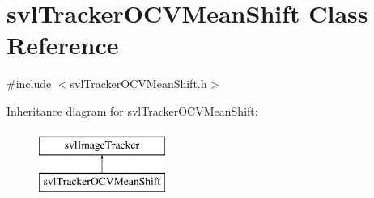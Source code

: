 \hypertarget{classsvl_tracker_o_c_v_mean_shift}{}\section{svl\+Tracker\+O\+C\+V\+Mean\+Shift Class Reference}
\label{classsvl_tracker_o_c_v_mean_shift}


{\ttfamily \#include $<$svl\+Tracker\+O\+C\+V\+Mean\+Shift.\+h$>$}

Inheritance diagram for svl\+Tracker\+O\+C\+V\+Mean\+Shift\+:\begin{figure}[H]
\begin{center}
\leavevmode
\includegraphics[height=2.000000cm]{d2/d5b/classsvl_tracker_o_c_v_mean_shift}
\end{center}
\end{figure}
